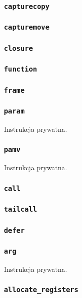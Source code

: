 \subsubsection{\texttt{capturecopy}}
\subsubsection{\texttt{capturemove}}

\subsubsection{\texttt{closure}}
\subsubsection{\texttt{function}}

\subsubsection{\texttt{frame}}
\subsubsection{\texttt{param}}

Instrukcja prywatna.

\subsubsection{\texttt{pamv}}

Instrukcja prywatna.

\subsubsection{\texttt{call}}
\subsubsection{\texttt{tailcall}}
\subsubsection{\texttt{defer}}
\subsubsection{\texttt{arg}}

Instrukcja prywatna.

\subsubsection{\texttt{allocate\_registers}}

